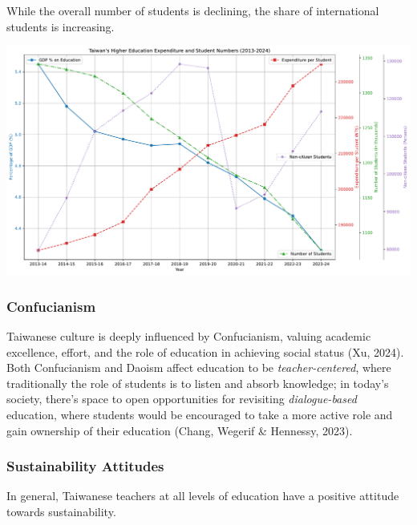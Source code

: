 \documentclass[
  letterpaper,
  DIV=11,
  numbers=noendperiod]{scrartcl}
\begin{document}
While the overall number of students is declining, the share of
international students is increasing.

\includegraphics{_thesis_files/figure-pdf/cell-9-output-1.pdf}

\subsubsection{Confucianism}\label{confucianism}

Taiwanese culture is deeply influenced by Confucianism, valuing academic
excellence, effort, and the role of education in achieving social status
(Xu, 2024). Both Confucianism and Daoism affect education to be
\emph{teacher-centered}, where traditionally the role of students is to
listen and absorb knowledge; in today's society, there's space to open
opportunities for revisiting \emph{dialogue-based} education, where
students would be encouraged to take a more active role and gain
ownership of their education (Chang, Wegerif \& Hennessy, 2023).

\subsubsection{Sustainability Attitudes}\label{sustainability-attitudes}

In general, Taiwanese teachers at all levels of education have a
positive attitude towards sustainability.
\end{document}
